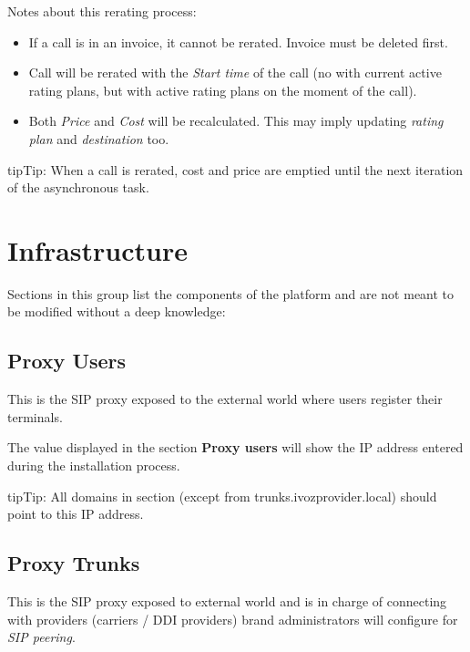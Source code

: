 \documentclass[letterpaper,10pt,english]{sphinxmanual}
\begin{document}
Notes about this rerating process:
\begin{itemize}
\item {} 
If a call is in an invoice, it cannot be rerated. Invoice must be deleted first.

\item {} 
Call will be rerated with the \emph{Start time} of the call (no with current active rating plans, but with active rating plans
on the moment of the call).

\item {} 
Both \emph{Price} and \emph{Cost} will be recalculated. This may imply updating \emph{rating plan} and \emph{destination} too.

\end{itemize}

\begin{notice}{tip}{Tip:}
When a call is rerated, cost and price are emptied until the next iteration of the asynchronous task.
\end{notice}


\section{Infrastructure}
\label{administration_portal/platform/infrastructure/index:infrastructure}\label{administration_portal/platform/infrastructure/index::doc}
Sections in this group list the components of the platform and are not meant to be modified without a deep knowledge:


\subsection{Proxy Users}
\label{administration_portal/platform/infrastructure/proxy_users:proxy-users}\label{administration_portal/platform/infrastructure/proxy_users:proxyusers}\label{administration_portal/platform/infrastructure/proxy_users::doc}
This is the SIP proxy exposed to the external world where users register their
terminals.

The value displayed in the section \textbf{Proxy users} will show the IP address
entered during the installation process.

\begin{notice}{tip}{Tip:}
All domains in  section (except from trunks.ivozprovider.local) should point to this IP address.
\end{notice}


\subsection{Proxy Trunks}
\label{administration_portal/platform/infrastructure/proxy_trunks:proxy-trunks}\label{administration_portal/platform/infrastructure/proxy_trunks::doc}\label{administration_portal/platform/infrastructure/proxy_trunks:id1}
This is the SIP proxy exposed to external world and is in charge of connecting
with providers (carriers / DDI providers) brand administrators will configure for \emph{SIP peering}.
\end{document}

